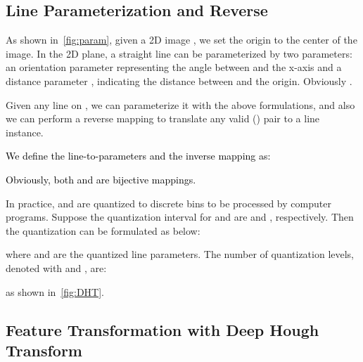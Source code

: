 \documentclass[10pt,journal,cspaper,compsoc]{IEEEtran}
\newcommand{\revise}[1]{{\textcolor{black}{#1}}}
\newcommand{\CheckRmv}[1]{}
\newcommand{\CheckRmv}[1]{#1}
\begin{document}
\subsection{Line Parameterization and Reverse} \label{sec:preliminary}
\CheckRmv{
\begin{figure}[!htb]
  \centering
    \begin{overpic}[height=.6\linewidth]{figures/line_param.pdf}
      \put(29, 29){}
      \put(57, 55){}
      \put(100, 50){}
      \put(52, 100){}
    \end{overpic}
  \caption{A line can be parameterized by bias  and slope .
  }\label{fig:param}
\end{figure}
}
As shown in~\cref{fig:param},
given a 2D image \revise{},
we set the origin to the center of the image.
In the 2D plane, a straight line  can be parameterized by two parameters: an orientation parameter  representing the angle between  and the x-axis and a distance parameter , indicating the distance between  and the origin.
Obviously .

Given any line  on , we can parameterize it with the above formulations,
and also we can perform a reverse mapping to translate any valid
() pair to a line instance.
\revise{We define the line-to-parameters and the inverse mapping
as:

Obviously, both  and  are bijective mappings.}
In practice,  and  are quantized to discrete bins to be processed by computer programs.
Suppose the quantization interval for  and  are  and , respectively.
Then the quantization can be formulated as below:

where  and  are the quantized line parameters.
The number of quantization levels, denoted with  and , are:

as shown in~\cref{fig:DHT}.

\subsection{Feature Transformation with Deep Hough Transform} \label{sec:dht-dht}
\end{document}

